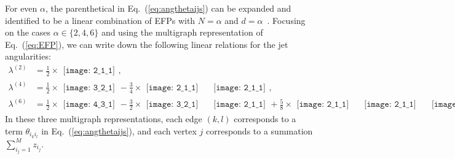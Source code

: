 \documentclass[aps,prd,twocolumn, superscriptaddress,preprintnumbers, nofootinbib,longbibliography,floatfix]{revtex4-2}
\DeclareRobustCommand{\Eq}[1]{Eq.~(\ref{#1})}
\begin{document}
For even $\alpha$, the parenthetical in \Eq{eq:angthetaijs} can be expanded and identified to be a linear combination of EFPs with $N = \alpha$ and $d=\alpha$~\cite{Gur-Ari:2011cjr}.
%
Focusing on the cases $\alpha \in \{2, 4, 6\}$ and using the multigraph representation of \Eq{eq:EFP}, we can write down the following linear relations for the jet angularities:
%
\begin{align}
\lambda^{(2)} &= \frac{1}{2} \times
\begin{gathered}
\texttt{[image: 2\_1\_1]}
\end{gathered}, \label{eq:lambda2}
\\
\lambda^{(4)} &= \frac{1}{2} \times
\begin{gathered}
\texttt{[image: 3\_2\_1]}
\end{gathered}
- \frac{3}{4} \times
\begin{gathered}
\texttt{[image: 2\_1\_1]}
\end{gathered}
\quad
\begin{gathered}
\texttt{[image: 2\_1\_1]}
\end{gathered},
\\
\lambda^{(6)} &= \frac{1}{2} \times
\begin{gathered}
\texttt{[image: 4\_3\_1]}
\end{gathered}
-\frac{3}{2} \times
\begin{gathered}
\texttt{[image: 3\_2\_1]}
\end{gathered}
\quad
\begin{gathered}
\texttt{[image: 2\_1\_1]}
\end{gathered}
+ \frac{5}{8} \times
\begin{gathered}
\texttt{[image: 2\_1\_1]}
\end{gathered}
\quad
\begin{gathered}
\texttt{[image: 2\_1\_1]}
\end{gathered}
\quad
\begin{gathered}
\texttt{[image: 2\_1\_1]}
\end{gathered}.
\end{align}
%
In these three multigraph representations, each edge $(k,l)$ corresponds to a term $\theta_{i_k i_l}$ in \Eq{eq:angthetaijs}, and each vertex $j$ corresponds to a summation $\sum_{i_j=1}^M z_{i_j}$.
\end{document}
